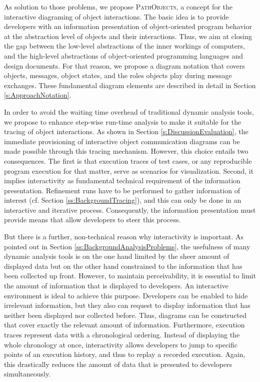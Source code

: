 As solution to those problems, we propose \textsc{PathObjects}, a concept for the interactive diagraming of object interactions.
The basic idea is to provide developers with an information presentation of object-oriented program behavior at the abstraction level of objects and their interactions.
Thus, we aim at closing the gap between the low-level abstractions of the inner workings of computers, and the high-level abstractions of object-oriented programming languages and design documents.
For that reason, we propose a diagram notation that covers objects, messages, object states, and the roles objects play during message exchanges.
These fundamental diagram elements are described in detail in Section \ref{s:ApproachNotation}.

In order to avoid the waiting time overhead of traditional dynamic analysis tools, we propose to enhance step-wise run-time analysis to make it suitable for the tracing of object interactions.
As shown in Section \ref{s:DiscussionEvaluation}, the immediate provisioning of interactive object communication diagrams can be made possible through this tracing mechanism.
However, this choice entails two consequences.
The first is that execution traces of test cases, or any reproducible program execution for that matter, serve as scenarios for visualization.
Second, it implies interactivity as fundamental technical requirement of the information presentation.
Refinement runs have to be performed to gather information of interest (cf. Section \ref{ss:BackgroundTracing}), and this can only be done in an interactive and iterative process.
Consequently, the information presentation must provide means that allow developers to steer this process.

But there is a further, non-technical reason why interactivity is important.
As pointed out in Section \ref{ss:BackgroundAnalysisProblems}, the usefulness of many dynamic analysis tools is on the one hand limited by the sheer amount of displayed data  but on the other hand constrained to the information that has been collected up front.
However, to maintain perceivability, it is essential to limit the amount of information that is displayed to developers.
An interactive environment is ideal to achieve this purpose.
Developers can be enabled to hide irrelevant information, but they also can request to display information that has neither been displayed nor collected before.
Thus, diagrams can be constructed that cover exactly the relevant amount of information.
Furthermore, execution traces represent data with a chronological ordering.
Instead of displaying the whole chronology at once, interactivity allows developers to jump to specific points of an execution history, and thus to replay a recorded execution.
Again, this drastically reduces the amount of data that is presented to developers simultaneously.

